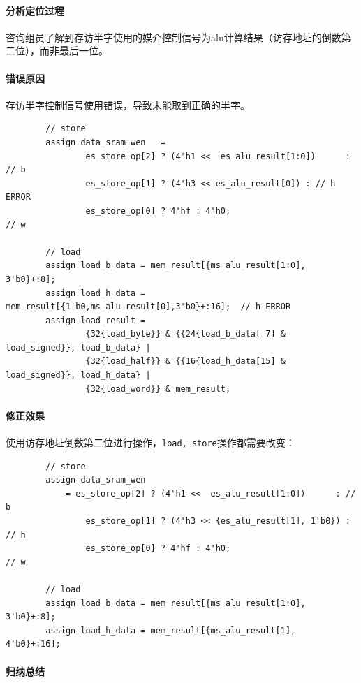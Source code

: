 \documentclass[UTF-8,twoside,c5size]{ctexart}
\begin{document}
	\paragraph{分析定位过程}\hfill
	
	咨询组员了解到存访半字使用的媒介控制信号为alu计算结果（访存地址的倒数第二位），而非最后一位。
	
	\paragraph{错误原因}\hfill
	
	存访半字控制信号使用错误，导致未能取到正确的半字。
	
	\begin{lstlisting}
		// store
		assign data_sram_wen   = 
				es_store_op[2] ? (4'h1 <<  es_alu_result[1:0])      : // b
				es_store_op[1] ? (4'h3 << es_alu_result[0]) : // h ERROR
				es_store_op[0] ? 4'hf : 4'h0;                          // w
		
		// load
		assign load_b_data = mem_result[{ms_alu_result[1:0], 3'b0}+:8];
		assign load_h_data = mem_result[{1'b0,ms_alu_result[0],3'b0}+:16];	// h ERROR
		assign load_result = 
				{32{load_byte}} & {{24{load_b_data[ 7] & load_signed}}, load_b_data} |
				{32{load_half}} & {{16{load_h_data[15] & load_signed}}, load_h_data} |
				{32{load_word}} & mem_result;
	\end{lstlisting}
	
	\paragraph{修正效果}\hfill
	
	使用访存地址倒数第二位进行操作，\texttt{load, store}操作都需要改变：
	
	\begin{lstlisting}
		// store
		assign data_sram_wen 
			= es_store_op[2] ? (4'h1 <<  es_alu_result[1:0])      : // b
				es_store_op[1] ? (4'h3 << {es_alu_result[1], 1'b0}) : // h
				es_store_op[0] ? 4'hf : 4'h0;                          // w
												 
		// load
		assign load_b_data = mem_result[{ms_alu_result[1:0], 3'b0}+:8];
		assign load_h_data = mem_result[{ms_alu_result[1],   4'b0}+:16];
	\end{lstlisting}
	
	\paragraph{归纳总结}\hfill
	
\end{document}
